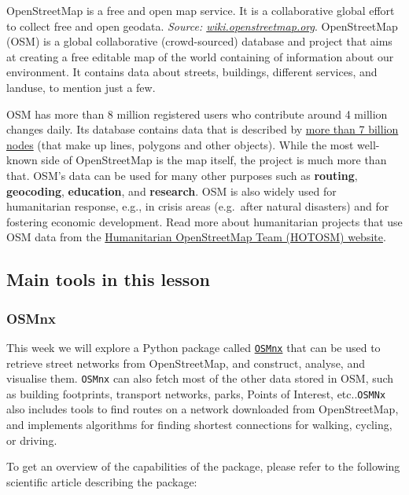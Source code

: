 \documentclass[
  letterpaper,
  DIV=11,
  numbers=noendperiod]{scrreprt}
\begin{document}
OpenStreetMap is a free and open map service. It is a collaborative
global effort to collect free and open geodata. \emph{Source:
\href{https://wiki.openstreetmap.org/wiki/Logos}{wiki.openstreetmap.org}}.
OpenStreetMap (OSM) is a global collaborative (crowd-sourced) database
and project that aims at creating a free editable map of the world
containing of information about our environment. It contains data about
streets, buildings, different services, and landuse, to mention just a
few.

OSM has more than 8 million registered users who contribute around 4
million changes daily. Its database contains data that is described by
\href{http://wiki.openstreetmap.org/wiki/Stats}{more than 7 billion
nodes} (that make up lines, polygons and other objects). While the most
well-known side of OpenStreetMap is the map itself, the project is much
more than that. OSM's data can be used for many other purposes such as
\textbf{routing}, \textbf{geocoding}, \textbf{education}, and
\textbf{research}. OSM is also widely used for humanitarian response,
e.g., in crisis areas (e.g.~after natural disasters) and for fostering
economic development. Read more about humanitarian projects that use OSM
data from the \href{https://www.hotosm.org}{Humanitarian OpenStreetMap
Team (HOTOSM) website}.

\subsection{Main tools in this lesson}\label{main-tools-in-this-lesson}

\subsubsection{OSMnx}\label{osmnx}

This week we will explore a Python package called
\href{https://github.com/gboeing/osmnx}{\texttt{OSMnx}} that can be used
to retrieve street networks from OpenStreetMap, and construct, analyse,
and visualise them. \texttt{OSMnx} can also fetch most of the other data
stored in OSM, such as building footprints, transport networks, parks,
Points of Interest, etc..\texttt{OSMNx} also includes tools to find
routes on a network downloaded from OpenStreetMap, and implements
algorithms for finding shortest connections for walking, cycling, or
driving.

To get an overview of the capabilities of the package, please refer to
the following scientific article describing the package:
\end{document}
